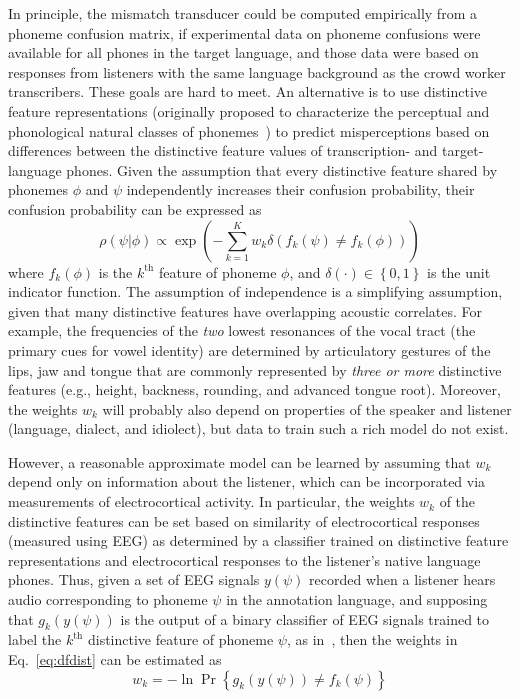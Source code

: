 In principle, the mismatch transducer could be computed empirically from
a phoneme confusion matrix, if experimental data on phoneme confusions
were available for all phones in the target language, and those data
were based on responses from listeners with the same language background
as the crowd worker transcribers. These goals are hard to meet. 
An alternative is to use distinctive feature representations
(originally proposed to characterize the perceptual and phonological
natural classes of phonemes~\cite{Jakobson52}) to predict misperceptions
based on differences between the distinctive feature values of 
transcription- and target-language phones. Given the assumption that 
every distinctive feature shared by phonemes $\phi$ and $\psi$ 
independently increases their confusion probability, their confusion 
probability can be expressed as
\begin{equation}
  \rho(\psi|\phi)\propto \exp\left(-\sum_{k=1}^K
  w_k\delta\left(f_k(\psi)\ne f_k(\phi)\right)\right)
  \label{eq:dfdist}
\end{equation}
where $f_k(\phi)$ is the $k^{\textrm{th}}$ feature of phoneme $\phi$,
and $\delta(\cdot)\in\left\{0,1\right\}$ is the unit indicator
function. The assumption of independence is a simplifying assumption,
given that many distinctive features have overlapping acoustic
correlates. For example, the frequencies of the {\em two} lowest
resonances of the vocal tract (the primary cues for vowel identity) are
determined by articulatory gestures of the lips, jaw and tongue that are
commonly represented by {\em three or more} distinctive features
(e.g., height, backness, rounding, and advanced tongue root). Moreover,
the weights $w_k$ will probably also depend on properties of the speaker
and listener (language, dialect, and idiolect), but data to train such a
rich model do not exist.

However, a reasonable approximate model can be learned by assuming that
$w_k$ depend only on information about the listener, which can be
incorporated via measurements of electrocortical activity. In particular,
the weights $w_k$ of the distinctive features can be set based on similarity
of electrocortical responses (measured using EEG) as determined by a
classifier trained on distinctive feature representations and
electrocortical responses to the listener's native language phones. Thus,
given a set of EEG signals $y(\psi)$ recorded when a listener
hears audio corresponding to phoneme $\psi$ in the annotation
language, and supposing that $g_k(y(\psi))$ is the output of a binary
classifier of EEG signals trained to label the $k^{\textrm{th}}$
distinctive feature of phoneme $\psi$, as in~\cite{Liberto15}, then
the weights in Eq.~\ref{eq:dfdist} can be estimated as
\begin{equation}
  w_k = -\ln\Pr\left\{g_k(y(\psi))\ne f_k(\psi)\right\}
  \label{eq:eegdist}
\end{equation}
